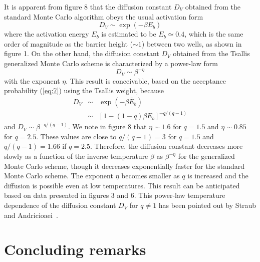 It is apparent from figure 8 that the diffusion constant $D_{V}$ obtained
from the standard Monte Carlo algorithm obeys the usual activation form
\begin{equation}
D_{V} \sim \exp\left(-\beta E_{b}\right)
\label{eq:21}
\end{equation}
where the activation energy $E_{b}$ is estimated to be $E_{b}\simeq 0.4$,
which is the same order of magnitude as the barrier height ($\sim 1$)
between two wells, as shown in figure 1.   On the other hand, the
diffusion
constant $D_{V}$ obtained from the Tsallis generalized Monte Carlo scheme is
characterized by a power-law form
\begin{equation}
D_{V} \sim \beta^{-\eta}
\label{eq:22}
\end{equation}
with the exponent $\eta$.  This result is conceivable, based on the
acceptance
probability (\ref{eq:7}) using the Tsallis weight, because
\begin{eqnarray}
D_{V} &\sim& \exp(-\beta\bar{E}_{b})
\nonumber \\
&\sim& \left[1-(1-q)\beta E_{b} \right]^{-q/(q-1)}
\label{eq:23}
\end{eqnarray}
and $D_{V}\sim \beta^{-q/(q-1)}$.  We note in figure 8 that $\eta\sim 1.6$
for $q=1.5$ and $\eta\sim 0.85$
for $q=2.5$.  These values are close to $q/(q-1)=3$ for $q=1.5$ and
$q/(q-1)=1.66$ if $q=2.5$.  Therefore, the diffusion constant decreases
more slowly as a function of the inverse temperature $\beta$ as
$\beta^{-\eta}$ for the
generalized Monte Carlo scheme, though it decreases exponentially
faster for
the standard Monte Carlo scheme.  The exponent $\eta$ becomes smaller as
$q$ is increased and the diffusion is possible even at low temperatures. 
This result can be anticipated based on data presented in figures 3
and 6.  This power-law temperature dependence of the diffusion constant
$D_{V}$ for $q\neq 1$ has been pointed out by Straub and
Andricioaei~\cite{SA2}.


\section{Concluding remarks}

